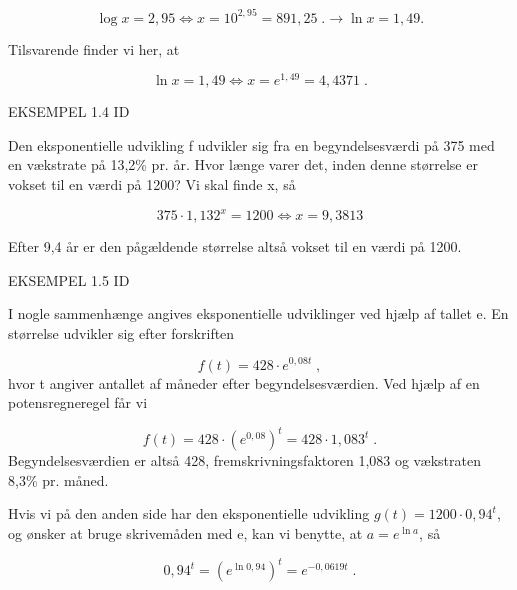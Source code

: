 \documentclass[12pt,oneside,a4paper]{article}
\theoremstyle{plain}
\begin{document}
\[
\log x = 2,95 \iff x = 10^{2,95} = 891,25 \; .
\rightarrow \ln x = 1,49.
\]

Tilsvarende finder vi her, at

\[
\ln x = 1,49 \iff x = e^{1,49} = 4,4371 \; .
\]

EKSEMPEL 1.4 ID

Den eksponentielle udvikling f udvikler sig fra en begyndelsesværdi på 375 med
en vækstrate på 13,2\% pr. år. Hvor længe varer det, inden denne størrelse er
vokset til en værdi på 1200? Vi skal finde x, så

\[
375 \cdot 1,132^x = 1200 \iff x = 9,3813
\]

Efter 9,4 år er den pågældende størrelse altså vokset til en værdi på 1200.

EKSEMPEL 1.5 ID

I nogle sammenhænge angives eksponentielle udviklinger ved hjælp af tallet e.
En størrelse udvikler sig efter forskriften

\[
f(t) = 428 \cdot e^{0,08t} \; ,
\]
hvor t angiver antallet af måneder efter begyndelsesværdien. Ved hjælp af en
potensregneregel får vi

\[
f(t) = 428 \cdot (e^{0,08})^t = 428 \cdot 1,083^t \; .
\]
Begyndelsesværdien er altså 428, fremskrivningsfaktoren 1,083 og vækstraten
8,3\% pr. måned.

Hvis vi på den anden side har den eksponentielle udvikling $g(t) = 1200 \cdot 0,94^t$,
og ønsker at bruge skrivemåden med e, kan vi benytte, at  $a = e^{\ln a}$, så 

\[
0,94^t = (e^{\ln 0,94})^t = e^{-0,0619t} \; .
\]
\end{document}
